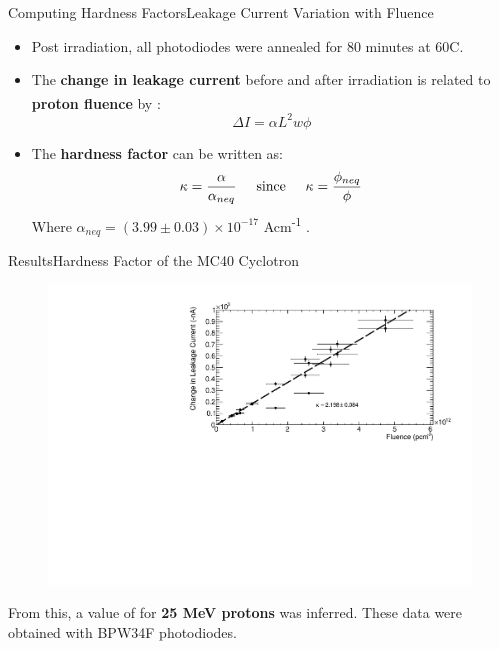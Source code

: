 \documentclass{beamer}
\begin{document}
    \begin{frame}{Computing Hardness Factors}{Leakage Current Variation with Fluence}
        \begin{itemize}
            \item Post irradiation, all photodiodes were annealed for 80 minutes at 60\degree C.
            \item The \textbf{change in leakage current} before and after irradiation is related to \textbf{proton fluence} by \textsuperscript{\cite{Moll}}:
                \begin{equation*}
                    \Delta I = \alpha L^2 w \phi
                \end{equation*}
            \item The \textbf{hardness factor} can be written as:
                \begin{equation*}
                    \kappa = \frac{\alpha}{\alpha _{neq}}\hspace{0.5cm}\text{since}\hspace{0.5cm}\kappa = \frac{\phi _{neq}}{\phi}
                \end{equation*}
                Where $\alpha _{neq} = (3.99 \pm 0.03)\times 10^{-17}$ Acm\textsuperscript{-1} \textsuperscript{\cite{Moll}}.
        \end{itemize}
    \end{frame}
    
    \begin{frame}{Results}{Hardness Factor of the MC40 Cyclotron}
        \begin{figure}
            \centering
            \includegraphics[width = 0.9\linewidth]{MC40_seminar.pdf}
        \end{figure}
    \vspace{-0.3cm}
    From this, a value of  for \textbf{25 MeV protons} was inferred. These data were obtained with BPW34F photodiodes.
    \end{frame}
\end{document}
